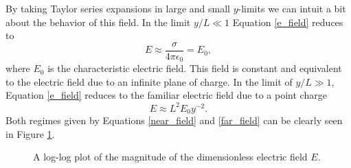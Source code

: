 \documentclass[aip,reprint, floatfix]{revtex4-1}
\begin{document}
By taking Taylor series expansions in large and small $y$-limits we can intuit a bit about the behavior of this field. In the limit $y/L \ll 1$ Equation \ref{e_field} reduces to
\begin{equation}
\label{near_field}
E \approx \frac{\sigma}{4 \pi \epsilon_0} = E_0,
\end{equation}
where $E_0$ is the characteristic electric field. This field is constant and equivalent to the electric field due to an infinite plane of charge. In the limit of $y/L \gg 1$, Equation \ref{e_field} reduces to the familiar electric field due to a point charge
\begin{equation}
\label{far_field}
E \approx L^2 E_0 y^{-2}.
\end{equation}
Both regimes given by Equations \ref{near_field} and \ref{far_field} can be clearly seen in Figure \ref{fig:E0}.
\begin{figure}[h]
    \centering
    \def\svgwidth{\columnwidth}
    
    \caption{A log-log plot of the magnitude of the dimensionless electric field $E$.\label{fig:E0}}
\end{figure}
\end{document}
